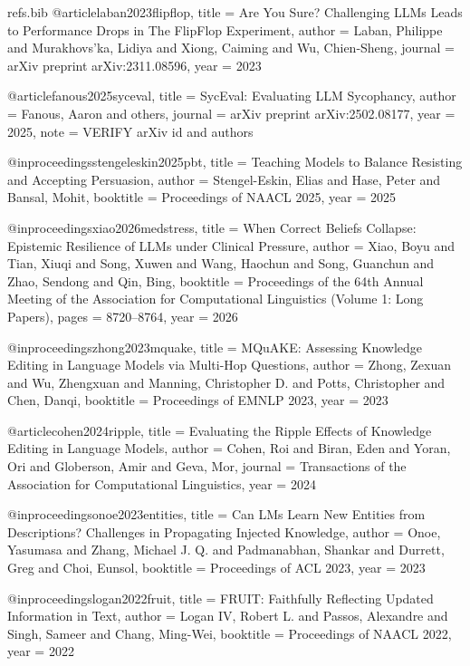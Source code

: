 \begin{filecontents*}[overwrite]{refs.bib}
@article{laban2023flipflop,
  title   = {Are You Sure? Challenging {LLMs} Leads to Performance Drops in The {FlipFlop} Experiment},
  author  = {Laban, Philippe and Murakhovs'ka, Lidiya and Xiong, Caiming and Wu, Chien-Sheng},
  journal = {arXiv preprint arXiv:2311.08596},
  year    = {2023}
}

@article{fanous2025syceval,
  title   = {{SycEval}: Evaluating {LLM} Sycophancy},
  author  = {Fanous, Aaron and others},
  journal = {arXiv preprint arXiv:2502.08177},
  year    = {2025},
  note    = {VERIFY arXiv id and authors}
}

@inproceedings{stengeleskin2025pbt,
  title     = {Teaching Models to Balance Resisting and Accepting Persuasion},
  author    = {Stengel-Eskin, Elias and Hase, Peter and Bansal, Mohit},
  booktitle = {Proceedings of NAACL 2025},
  year      = {2025}
}

@inproceedings{xiao2026medstress,
  title     = {When Correct Beliefs Collapse: Epistemic Resilience of {LLMs} under Clinical Pressure},
  author    = {Xiao, Boyu and Tian, Xiuqi and Song, Xuwen and Wang, Haochun and Song, Guanchun and Zhao, Sendong and Qin, Bing},
  booktitle = {Proceedings of the 64th Annual Meeting of the Association for Computational Linguistics (Volume 1: Long Papers)},
  pages     = {8720--8764},
  year      = {2026}
}

@inproceedings{zhong2023mquake,
  title     = {{MQuAKE}: Assessing Knowledge Editing in Language Models via Multi-Hop Questions},
  author    = {Zhong, Zexuan and Wu, Zhengxuan and Manning, Christopher D. and Potts, Christopher and Chen, Danqi},
  booktitle = {Proceedings of EMNLP 2023},
  year      = {2023}
}

@article{cohen2024ripple,
  title   = {Evaluating the Ripple Effects of Knowledge Editing in Language Models},
  author  = {Cohen, Roi and Biran, Eden and Yoran, Ori and Globerson, Amir and Geva, Mor},
  journal = {Transactions of the Association for Computational Linguistics},
  year    = {2024}
}

@inproceedings{onoe2023entities,
  title     = {Can {LMs} Learn New Entities from Descriptions? Challenges in Propagating Injected Knowledge},
  author    = {Onoe, Yasumasa and Zhang, Michael J. Q. and Padmanabhan, Shankar and Durrett, Greg and Choi, Eunsol},
  booktitle = {Proceedings of ACL 2023},
  year      = {2023}
}

@inproceedings{logan2022fruit,
  title     = {{FRUIT}: Faithfully Reflecting Updated Information in Text},
  author    = {Logan IV, Robert L. and Passos, Alexandre and Singh, Sameer and Chang, Ming-Wei},
  booktitle = {Proceedings of NAACL 2022},
  year      = {2022}
}


\end{filecontents*}
